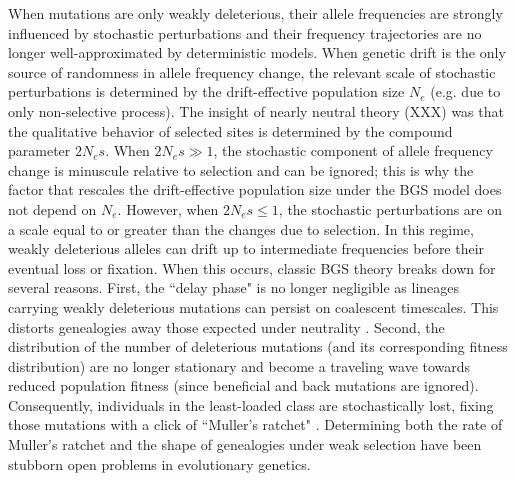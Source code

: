 \documentclass[11pt]{article}
\begin{document}
When mutations are only weakly deleterious, their allele frequencies are
strongly influenced by stochastic perturbations and their frequency
trajectories are no longer well-approximated by deterministic models. When
genetic drift is the only source of randomness in allele frequency change, the
relevant scale of stochastic perturbations is determined by the drift-effective
population size $N_e$ (e.g. due to only non-selective process). The insight of
nearly neutral theory (XXX) was that the qualitative behavior of selected sites
is determined by the compound parameter $2N_e s$. When $2N_e s \gg 1$, the
stochastic component of allele frequency change is minuscule relative to
selection and can be ignored; this is why the factor that rescales the
drift-effective population size under the BGS model does not depend on $N_e$.
However, when $2N_e s \le 1$, the stochastic perturbations are on a scale equal
to or greater than the changes due to selection. In this regime, weakly
deleterious alleles can drift up to intermediate frequencies before their
eventual loss or fixation. When this occurs, classic BGS theory breaks down for
several reasons. First, the ``delay phase" is no longer negligible as lineages
carrying weakly deleterious mutations can persist on coalescent timescales.
This distorts genealogies away those expected under neutrality
\parencite{Przeworski1999-mb,OFallon2010-my,Higgs1995-xc}. Second, the
distribution of the number of deleterious mutations (and its corresponding
fitness distribution) are no longer stationary and become a traveling wave
\parencite{Rouzine2008-qz,Good2013-lp,Gessler1995-hz} towards reduced
population fitness (since beneficial and back mutations are ignored).
Consequently, individuals in the least-loaded class are stochastically lost,
fixing those mutations with a click of ``Muller's ratchet"
\parencite{Muller1964-ki}. Determining both the rate of Muller's ratchet
\parencite{Haigh1978-gt,Gordo2002-dr,Gessler1995-hz} and the shape of
genealogies under weak selection have been stubborn open problems in
evolutionary genetics.
\end{document}
